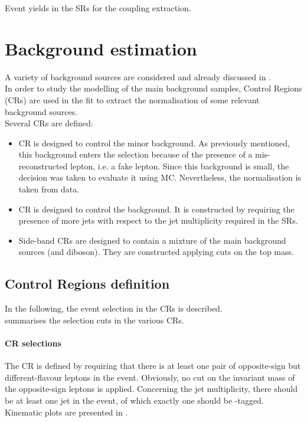 \begin{table}[!htbp]
	\centering
	\small
	
	\caption{Event yields in the SRs for the \tZc coupling extraction. \TabErrStatOnly} 
	\label{tab:sel:yields:tzc}
\end{table} 


\clearpage
\section{Background estimation}
\label{sec:background_all}
A variety of background sources are considered and already discussed in .\\
In order to study the modelling of the main background samples, Control Regions (CRs) are used in the fit to extract the normalisation of some relevant background sources.\\
Several CRs are defined:
\begin{itemize}
	\item \ttbar CR is designed to control the minor \ttbar
	background. As previously mentioned, this background enters the
	selection because of the presence of a mis-reconstructed lepton,
	i.e. a fake lepton. Since this background is small, the decision was
	taken to evaluate it using MC. Nevertheless, the normalisation is
	taken from data. 
	\item \ttZ CR is designed to control the \ttZ
	background. It is constructed by requiring the presence of more jets
	with respect to the jet multiplicity required in the SRs.
	\item Side-band CRs are designed to contain a mixture
	of the main background sources (\ttZ and diboson). They are
	constructed applying cuts on the top mass.
\end{itemize}

\subsection {Control Regions definition}
\label{sec:bkg:sel}
In the following, the event selection in the CRs is described.\\
 summarises the selection cuts in the various CRs.
\paragraph{\ttbar CR selections}
The \ttbar CR is defined by requiring that there is at least one pair
of opposite-sign but different-flavour leptons in the
event. Obviously, no cut on the invariant mass of the opposite-sign
leptons is applied. Concerning the jet multiplicity, there should be
at least one jet in the event, of which exactly one should be
\Pqb-tagged. Kinematic plots are presented in .

